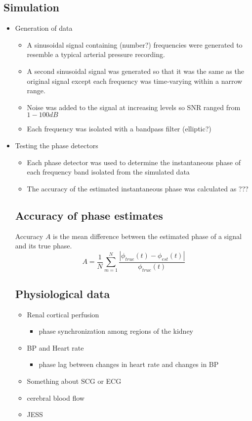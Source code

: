 \documentclass{article}
\begin{document}
\subsection*{Simulation}
\begin{itemize}
\item Generation of data
	\begin{itemize}
	\item A sinusoidal signal containing (number?) frequencies were generated to resemble a typical arterial pressure recording. 
	\item A second sinusoidal signal was generated so that it was the same as the original signal except each frequency was time-varying within a narrow range.
	\item Noise was added to the signal at increasing levels so SNR ranged from $1-100 dB$
	\item Each frequency was isolated with a bandpass filter (elliptic?)
	\end{itemize}
\item Testing the phase detectors
	\begin{itemize}
	\item Each phase detector was used to determine the instantaneous phase of each frequency band isolated from the simulated data
	\item The accuracy of the estimated instantaneous phase was calculated as ???
	\end{itemize}
	
\subsection*{Accuracy of phase estimates}
Accuracy $A$ is the mean difference between the estimated phase of a signal and its true phase. 
$$ A = \frac{1}{N} \sum_{m=1}^{N} \frac{\left| \phi _{true} (t) - \phi _{est} (t) \right|}{\phi _{true} (t)} $$

\subsection*{Physiological data}
\begin{itemize}
\item Renal cortical perfusion
	\begin{itemize}
	\item phase synchronization among regions of the kidney
	\end{itemize}
\item BP and Heart rate
	\begin{itemize}
	\item phase lag between changes in heart rate and changes in BP
	\end{itemize}
\item Something about SCG or ECG
\item cerebral blood flow
\item JESS
\end{itemize}

\end{itemize}
\end{document}
